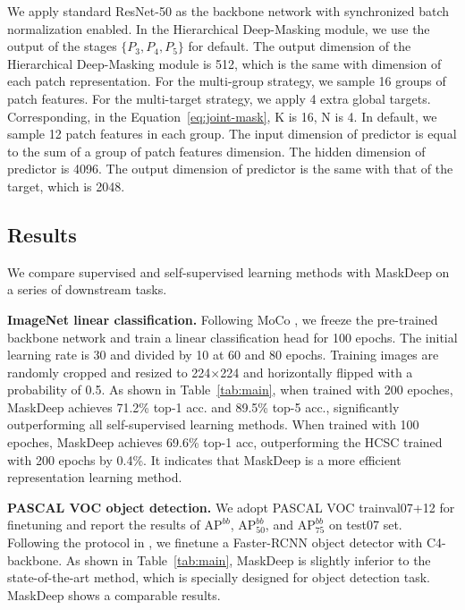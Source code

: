 \documentclass[10pt,twocolumn,letterpaper]{article}
\begin{document}
We apply standard ResNet-50 as the backbone network with synchronized batch normalization\cite{ioffe2015batch} enabled. 
In the Hierarchical Deep-Masking module, we use the output of the stages $\{P_3, P_4, P_5\}$ for default. The output dimension of the Hierarchical Deep-Masking module is 512, which is the same with dimension of each patch representation. For the multi-group strategy, we sample 16 groups of patch features. For the multi-target strategy, we apply 4 extra global targets. Corresponding, in the Equation~\ref{eq:joint-mask}, K is 16, N is 4. In default, we sample 12 patch features in each group. The input dimension of predictor is equal to the sum of a group of patch features dimension. The hidden dimension of predictor is 4096. The output dimension of predictor is the same with that of the target, which is 2048. 

\subsection{Results}

We compare supervised and self-supervised learning methods with MaskDeep on a series of downstream tasks. 

\noindent\textbf{ImageNet linear classification.} Following MoCo \cite{he2020momentum}, we freeze the pre-trained backbone network and train a linear classification head for 100 epochs. 
The initial learning rate is 30 and divided by 10 at 60 and 80 epochs. Training images are randomly cropped and resized to 224$\times$224 and horizontally flipped with a probability of 0.5. 
As shown in Table~\ref{tab:main}, when trained with 200 epoches, MaskDeep achieves 71.2\% top-1 acc. and 89.5\% top-5 acc., significantly outperforming all self-supervised learning methods. When trained with 100 epoches, MaskDeep achieves 69.6\% top-1 acc, outperforming the HCSC trained with 200 epochs by 0.4\%. It indicates that MaskDeep is a more efficient representation learning method.

\noindent\textbf{PASCAL VOC object detection.} We adopt PASCAL VOC trainval07+12 for finetuning and report the results of $\text{AP}^{bb}$, $\text{AP}^{bb}_{50}$, and $\text{AP}^{bb}_{75}$ on test07 set. Following the protocol in  \cite{densecl,xie2021detco}, we finetune a Faster-RCNN object detector with C4-backbone. As shown in Table~\ref{tab:main}, MaskDeep is slightly inferior to the state-of-the-art method, which is specially designed for object detection task. MaskDeep shows a comparable results. 
\end{document}
